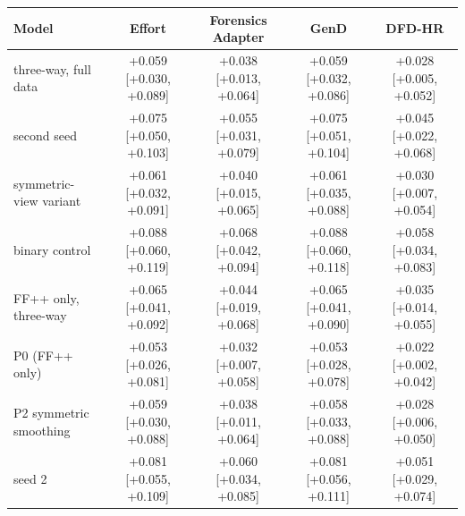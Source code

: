 \begin{tabular}{@{}l cccc@{}}
\toprule
Model & Effort & Forensics Adapter & GenD & DFD-HR \\
\midrule
\ours{} three-way, full data & +0.059 [+0.030, +0.089] & +0.038 [+0.013, +0.064] & +0.059 [+0.032, +0.086] & +0.028 [+0.005, +0.052] \\
\quad second seed & +0.075 [+0.050, +0.103] & +0.055 [+0.031, +0.079] & +0.075 [+0.051, +0.104] & +0.045 [+0.022, +0.068] \\
\quad symmetric-view variant & +0.061 [+0.032, +0.091] & +0.040 [+0.015, +0.065] & +0.061 [+0.035, +0.088] & +0.030 [+0.007, +0.054] \\
\ours{} binary control & +0.088 [+0.060, +0.119] & +0.068 [+0.042, +0.094] & +0.088 [+0.060, +0.118] & +0.058 [+0.034, +0.083] \\
\ours{} FF++ only, three-way & +0.065 [+0.041, +0.092] & +0.044 [+0.019, +0.068] & +0.065 [+0.041, +0.090] & +0.035 [+0.014, +0.055] \\
\ours{} P0 (FF++ only) & +0.053 [+0.026, +0.081] & +0.032 [+0.007, +0.058] & +0.053 [+0.028, +0.078] & +0.022 [+0.002, +0.042] \\
\ours{} P2 symmetric smoothing & +0.059 [+0.030, +0.088] & +0.038 [+0.011, +0.064] & +0.058 [+0.033, +0.088] & +0.028 [+0.006, +0.050] \\
\quad seed 2 & +0.081 [+0.055, +0.109] & +0.060 [+0.034, +0.085] & +0.081 [+0.056, +0.111] & +0.051 [+0.029, +0.074] \\
\bottomrule
\end{tabular}

